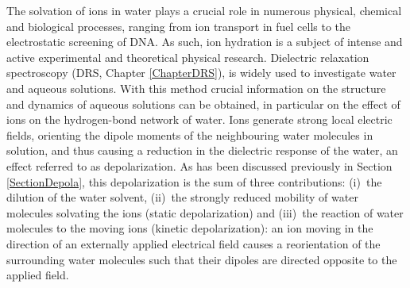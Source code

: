 The solvation of ions in water plays a crucial role in numerous physical, chemical and biological processes, ranging from ion transport in fuel cells to the electrostatic screening of DNA. As such, ion hydration is a subject of intense and active experimental and theoretical physical research.\!\cite{LyndenBell1996,Chakraborty2008,Zwolak2009,French2011,Yin2014,Fahrenberger2015}
Dielectric relaxation spectroscopy (DRS, Chapter \ref{ChapterDRS}), is widely used to investigate water and aqueous solutions. With this method crucial information on the structure and dynamics of aqueous solutions can be obtained,\!\cite{Kaatze1993,Buchner1999,Minoguchi2004,Buchner2008,Nakanishi2012,Rahman2012,Perticaroli2013,Ottosson2014c,Balos2015a,Popov2015,Balos2017a} in particular on the effect of ions on the hydrogen-bond network of water.
Ions generate strong local electric fields, orienting the dipole moments of the neighbouring water molecules in solution, and thus causing a reduction in the dielectric response of the water, an effect referred to as depolarization. As has been discussed previously in Section \ref{SectionDepola}, this depolarization is the sum of three contributions: (i)~the dilution of the water solvent,\!\cite{Onsager1936a,Kirkwood1939a,BOTTCHER1973} (ii)~the strongly reduced mobility of water molecules solvating the ions (static depolarization)\!\cite{Barthel1992} and (iii)~the reaction of water molecules to the moving ions (kinetic depolarization): an ion moving in the direction of an externally applied electrical field causes a reorientation of the surrounding water molecules such that their dipoles are directed opposite to the applied field.\!\cite{Hubbard1977a,Hubbard1977,Hubbard1978c,Hubbard1979a,VanderZwan1982,VanderZwan1983a}

